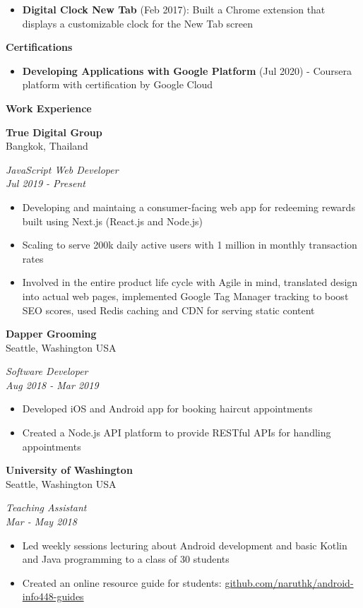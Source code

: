\documentclass[10pt,a4paper]{article}
\newcommand{\sectionheading}[1]{
  \vspace{14pt}
  \textbf{\Large #1}
  \vspace{6pt}
}
\newcommand{\subheadinginfo}[4]{
  \vspace{6pt}
  \noindent
  \begin{minipage}[t]{.5\textwidth}
    \textbf{#1} \\
    #2
  \end{minipage}%
  \begin{minipage}[t]{.5\textwidth}
    \raggedleft
    \textit{#3} \\
    \textit{#4}
  \end{minipage}
  \vspace{-4pt}
}
\newcommand{\listitem}[1]{
  \item #1 \vspace{-5pt}
}
\begin{document}
\begin{minipage}[t]{.4\textwidth}
  \begin{itemize}
    \listitem{\textbf{Digital Clock New Tab} (Feb 2017): Built a Chrome extension that displays a customizable clock for the New Tab screen}
  \end{itemize}

  \sectionheading{Certifications}

  \begin{itemize}
    \listitem{\textbf{Developing Applications with Google Platform} (Jul 2020) - Coursera platform with certification by Google Cloud}
  \end{itemize}

\end{minipage}
\hfill
%
%
\begin{minipage}[t]{0.55\textwidth} 
  \raggedright

  \sectionheading{Work Experience}

  \subheadinginfo
  {True Digital Group}
  {Bangkok, Thailand}
  {JavaScript Web Developer}
  {Jul 2019 - Present}

  \begin{itemize}
    \listitem{Developing and maintaing a consumer-facing web app for redeeming 
    rewards built using Next.js (React.js and Node.js)}
    \listitem{Scaling to serve 200k daily active users with 1 million 
    in monthly transaction rates}
    \listitem{Involved in the entire product life cycle with Agile in mind, 
    translated design into actual web pages, implemented Google Tag Manager 
    tracking to boost SEO scores, used Redis caching and CDN for serving static content}
  \end{itemize}

  \subheadinginfo
  {Dapper Grooming}
  {Seattle, Washington USA}
  {Software Developer}
  {Aug 2018 - Mar 2019}

  \begin{itemize}
    \listitem{Developed iOS and Android app for booking haircut appointments}
    \listitem{Created a Node.js API platform to provide RESTful APIs for handling appointments}
  \end{itemize}

  \subheadinginfo
  {University of Washington}
  {Seattle, Washington USA}
  {Teaching Assistant}
  {Mar - May 2018}

  \begin{itemize}
    \listitem{Led weekly sessions lecturing about Android development and basic
    Kotlin and Java programming to a class of 30 students}
    \listitem{Created an online resource guide for students: \href{https://github.com/naruthk/android-info448-guides}{github.com/naruthk/android-info448-guides}}
  \end{itemize}


\end{minipage}
\end{document}
